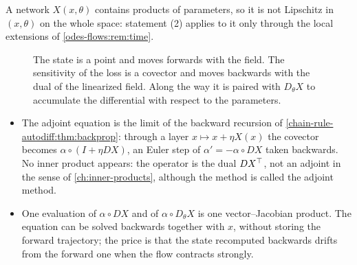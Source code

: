 \begin{notechapter}
A network $X(x, \theta)$ contains products of parameters, so it is not
Lipschitz in $(x, \theta)$ on the whole space: statement (2) applies
to it only through the local extensions of
\cref{odes-flows:rem:time}.

\begin{figure}[ht]
\centering
{}
\caption{The state is a point and moves forwards with the field. The
sensitivity of the loss is a covector and moves backwards with the
dual of the linearized field. Along the way it is paired with
$D_\theta X$ to accumulate the differential with respect to the
parameters.}
\label{odes-flows:fig:adjoint}
\end{figure}

\begin{mlthread}
\begin{itemize}[nosep]
  \item The adjoint equation is the limit of the backward recursion
        of \cref{chain-rule-autodiff:thm:backprop}: through a layer
        $x\mapsto x + \eta X(x)$ the covector becomes
        $\alpha\circ(I + \eta DX)$, an Euler step of
        $\alpha' = -\alpha\circ DX$ taken backwards. No inner product
        appears: the operator is the dual $DX^{\top}$, not an adjoint
        in the sense of \cref{ch:inner-products}, although the method
        is called the adjoint method.
  \item One evaluation of $\alpha\circ DX$ and of
        $\alpha\circ D_\theta X$ is one vector--Jacobian product. The
        equation can be solved backwards together with $x$, without
        storing the forward trajectory; the price is that the state
        recomputed backwards drifts from the forward one when the
        flow contracts strongly.
\end{itemize}
\end{mlthread}


\end{notechapter}
